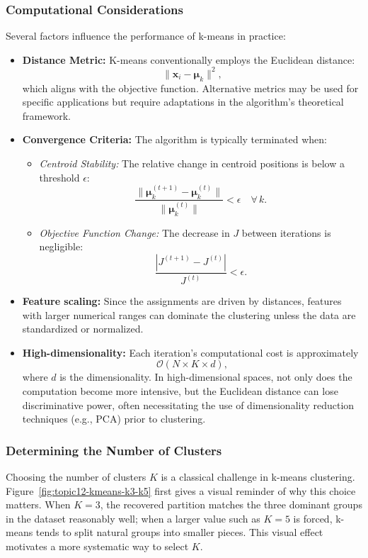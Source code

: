 \documentclass[12pt]{article}
\begin{document}
\subsubsection{Computational Considerations}

Several factors influence the performance of k-means in practice:
\begin{itemize}
    \item \textbf{Distance Metric:} K-means conventionally employs the Euclidean distance:
    \[
    \lVert \bm{x}_i - \bm{\mu}_k \rVert^2,
    \]
    which aligns with the objective function. Alternative metrics may be used for specific applications but require adaptations in the algorithm’s theoretical framework.
    \item \textbf{Convergence Criteria:} The algorithm is typically terminated when:
    \begin{itemize}
        \item \textit{Centroid Stability:} The relative change in centroid positions is below a threshold $\epsilon$:
        \[
        \frac{\lVert \bm{\mu}_k^{(t+1)} - \bm{\mu}_k^{(t)} \rVert}{\lVert \bm{\mu}_k^{(t)} \rVert} < \epsilon \quad \forall\, k.
        \]
        \item \textit{Objective Function Change:} The decrease in $J$ between iterations is negligible:
        \[
        \frac{|J^{(t+1)} - J^{(t)}|}{J^{(t)}} < \epsilon.
        \]
    \end{itemize}
    \item \textbf{Feature scaling:} Since the assignments are driven by distances, features with larger numerical ranges can dominate the clustering unless the data are standardized or normalized.
    \item \textbf{High-dimensionality:} Each iteration’s computational cost is approximately
    \[
    \mathcal{O}(N \times K \times d),
    \]
    where $d$ is the dimensionality. In high-dimensional spaces, not only does the computation become more intensive, but the Euclidean distance can lose discriminative power, often necessitating the use of dimensionality reduction techniques (e.g., PCA) prior to clustering.
\end{itemize}

\subsubsection{Determining the Number of Clusters}

Choosing the number of clusters $K$ is a classical challenge in k-means clustering. Figure~\ref{fig:topic12-kmeans-k3-k5} first gives a visual reminder of why this choice matters. When $K=3$, the recovered partition matches the three dominant groups in the dataset reasonably well; when a larger value such as $K=5$ is forced, k-means tends to split natural groups into smaller pieces. This visual effect motivates a more systematic way to select $K$.
\end{document}
